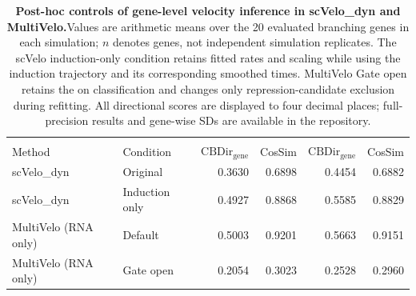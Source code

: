 \begin{table}[p]
\centering
\footnotesize
\setlength{\tabcolsep}{3pt}
\renewcommand{\arraystretch}{1.15}
\begin{tabular}{@{}llrrrr@{}}
\toprule
 & &  &  \\
\cmidrule(lr){3-4}\cmidrule(lr){5-6}
Method & Condition & $\mathrm{CBDir}_{\mathrm{gene}}$ & CosSim & $\mathrm{CBDir}_{\mathrm{gene}}$ & CosSim \\
\midrule
scVelo\_dyn & Original & 0.3630 & 0.6898 & 0.4454 & 0.6882 \\
scVelo\_dyn & Induction only & 0.4927 & 0.8868 & 0.5585 & 0.8829 \\
MultiVelo (RNA only) & Default & 0.5003 & 0.9201 & 0.5663 & 0.9151 \\
MultiVelo (RNA only) & Gate open & 0.2054 & 0.3023 & 0.2528 & 0.2960 \\
\bottomrule
\end{tabular}
\caption{\textbf{\normalsize Post-hoc controls of gene-level velocity inference in scVelo\_dyn and MultiVelo.}\label{tab:suppMultiveloPhaseControls}
\footnotesize\normalfont
Values are arithmetic means over the 20 evaluated branching genes in each simulation; $n$ denotes genes, not independent simulation replicates. The scVelo induction-only condition retains fitted rates and scaling while using the induction trajectory and its corresponding smoothed times. MultiVelo Gate open retains the on classification and changes only repression-candidate exclusion during refitting. All directional scores are displayed to four decimal places; full-precision results and gene-wise SDs are available in the repository.}
\end{table}
